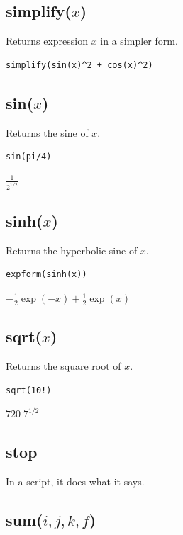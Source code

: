 \documentclass[12pt]{article}
\begin{document}
\subsection*{simplify($x$)}

Returns expression $x$ in a simpler form.

{\color{blue}
\begin{verbatim}
simplify(sin(x)^2 + cos(x)^2)
\end{verbatim}
}


\subsection*{sin($x$)}

Returns the sine of $x$.

{\color{blue}
\begin{verbatim}
sin(pi/4)
\end{verbatim}
}

\noindent
$\displaystyle \frac{1}{2^{1/2}}$

\subsection*{sinh($x$)}

Returns the hyperbolic sine of $x$.

{\color{blue}
\begin{verbatim}
expform(sinh(x))
\end{verbatim}
}

\noindent
$\displaystyle -\tfrac{1}{2}\exp(-x)+\tfrac{1}{2}\exp(x)$

\subsection*{sqrt($x$)}

Returns the square root of $x$.

{\color{blue}
\begin{verbatim}
sqrt(10!)
\end{verbatim}
}

\noindent
$\displaystyle 720\; 7^{1/2}$

\subsection*{stop}

In a script, it does what it says.

\subsection*{sum($i,j,k,f$)}
\end{document}

